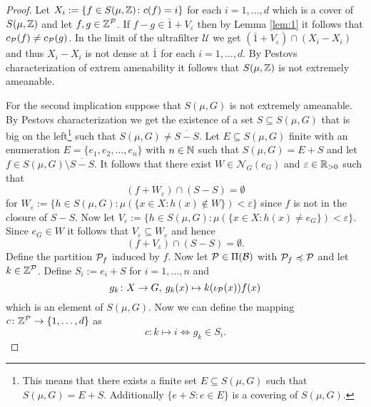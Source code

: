\begin{proof}
  Let $X_i := \{f \in S(\mu, \Z)\colon c(f) = i\}$ for each $i = 1, \ldots, d$ which is a cover of $S(\mu, \Z)$ and let $f, g \in \Z^\P$. If $f - g\in \bar{1} + V_\varepsilon$ then by Lemma \ref{lem:1} it follows that $c_\P(f) \neq c_\P(g)$.
  In the limit of the ultrafilter $\mathcal{U}$ we get $(\bar{1} + V_\varepsilon) \cap (X_i - X_i)$ and thus $X_i - X_i$ is not dense at $\bar{1}$ for each $i = 1, \ldots, d$. By Pestovs characterization \cite[Theorem 3.4.9]{PestovDyn} of extrem amenability it follows that $S(\mu, \Z)$ is not extremely ameanable. 

  For the second implication suppose that $S(\mu, G)$ is not extremely ameanable. By Pestovs characterization \cite[Theorem 3.4.9]{PestovDyn} we get the existence of a set $S \subseteq S(\mu, G)$ that is big on the left\footnote{This means that there exists a finite set $E \subseteq S(\mu, G)$ such that $S(\mu, G) = E + S.$ Additionally $\{e + S\colon e \in E\}$ is a covering of $S(\mu, G)$.} such that $S(\mu, G) \neq \overline{S - S}$. Let $E \subseteq S(\mu, G)$ finite with an enumeration $E = \{e_1, e_2, \ldots, e_n\}$ with $n \in \N$ such that $S(\mu, G) = E + S$ and let $f \in S(\mu, G) \setminus \overline{S - S}$. It follows that there exist $W \in \mathcal{N}_G(e_G)$ and $\varepsilon \in \R_{>0}$ such that
  \begin{equation*}
    (f + W_\varepsilon) \cap (S - S) = \emptyset
  \end{equation*}
  for $W_\varepsilon := \{h \in S(\mu, G)\colon \mu(\{x\in X\colon h(x) \notin W\}) < \varepsilon\}$ since $f$ is not in the closure of $S - S$. 
  Now let $V_\varepsilon := \{h \in S(\mu, G)\colon \mu(\{x\in X\colon h(x) \neq e_G\}) < \varepsilon\}$. Since $e_G \in W$ it follows that $V_\varepsilon \subseteq W_\varepsilon$ and hence
  \begin{equation*}
    (f + V_\varepsilon) \cap (S - S) = \emptyset.
  \end{equation*}
  Define the partition $\P_f$ induced by $f$.
  Now let $\P \in \Pi(\mathcal{B})$ with $\P_f \preccurlyeq \P$ and let $k \in \Z^\P$.
  Define $S_i := e_i + S$ for $i=1,\ldots,n$ and
  \begin{equation*}
    g_k\colon X \to G, \: g_k(x) \mapsto k(\iota_\P(x))f(x)
  \end{equation*}
  which is an element of $S(\mu, G)$. Now we can define the mapping $c\colon \Z^\P \to \{1,\ldots, d\}$ as
  \begin{equation*}
    c\colon k \mapsto i \iff g_k \in S_i.
  \end{equation*}


\end{proof}
